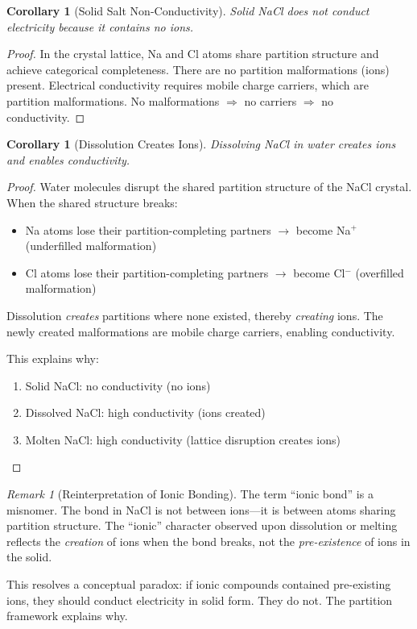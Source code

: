\documentclass[twocolumn,10pt,a4paper]{article}
\newtheorem{corollary}[theorem]{Corollary}
\theoremstyle{definition}
\theoremstyle{remark}
\newtheorem{remark}[theorem]{Remark}
\begin{document}
\begin{corollary}[Solid Salt Non-Conductivity]
\label{cor:solid_nonconductivity}
Solid NaCl does not conduct electricity because it contains no ions.
\end{corollary}

\begin{proof}
In the crystal lattice, Na and Cl atoms share partition structure and achieve categorical completeness. There are no partition malformations (ions) present. Electrical conductivity requires mobile charge carriers, which are partition malformations. No malformations $\Rightarrow$ no carriers $\Rightarrow$ no conductivity.
\end{proof}

\begin{corollary}[Dissolution Creates Ions]
\label{cor:dissolution_conductivity}
Dissolving NaCl in water creates ions and enables conductivity.
\end{corollary}

\begin{proof}
Water molecules disrupt the shared partition structure of the NaCl crystal. When the shared structure breaks:
\begin{itemize}
    \item Na atoms lose their partition-completing partners $\rightarrow$ become Na$^+$ (underfilled malformation)
    \item Cl atoms lose their partition-completing partners $\rightarrow$ become Cl$^-$ (overfilled malformation)
\end{itemize}

Dissolution \emph{creates} partitions where none existed, thereby \emph{creating} ions. The newly created malformations are mobile charge carriers, enabling conductivity.

This explains why:
\begin{enumerate}
    \item Solid NaCl: no conductivity (no ions)
    \item Dissolved NaCl: high conductivity (ions created)
    \item Molten NaCl: high conductivity (lattice disruption creates ions)
\end{enumerate}
\end{proof}

\begin{remark}[Reinterpretation of Ionic Bonding]
The term ``ionic bond'' is a misnomer. The bond in NaCl is not between ions---it is between atoms sharing partition structure. The ``ionic'' character observed upon dissolution or melting reflects the \emph{creation} of ions when the bond breaks, not the \emph{pre-existence} of ions in the solid.

This resolves a conceptual paradox: if ionic compounds contained pre-existing ions, they should conduct electricity in solid form. They do not. The partition framework explains why.
\end{remark}
\end{document}
